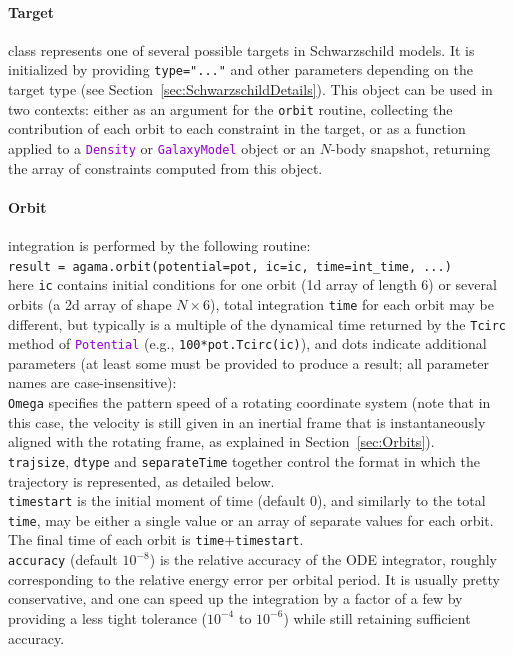 \documentclass[12pt]{article}
\newcommand{\ttt}[1]{\textcolor{darkviolet}{\texttt{#1}}}
\newcommand{\ppp}[1]{\textcolor{darkolive} {\texttt{#1}}}
\let\oldparagraph\paragraph
\renewcommand{\paragraph}[1]{\vspace{-2mm}\oldparagraph{#1}}
\begin{document}
\paragraph{Target} class represents one of several possible targets in Schwarzschild models. It is initialized by providing \ppp{type="..."} and other parameters depending on the target type (see Section~\ref{sec:SchwarzschildDetails}). This object can be used in two contexts: either as an argument for the \texttt{orbit} routine, collecting the contribution of each orbit to each constraint in the target, or as a function applied to a \ttt{Density} or \ttt{GalaxyModel} object or an $N$-body snapshot, returning the array of constraints computed from this object.

\paragraph{Orbit} integration is performed by the following routine:\\
\texttt{result = agama.orbit(potential=pot, ic=ic, time=int_time, ...)}\\
here \ppp{ic} contains initial conditions for one orbit (1d array of length 6) or several orbits (a 2d array of shape $N\times6$), total integration \ppp{time} for each orbit may be different, but typically is a multiple of the dynamical time returned by the \texttt{Tcirc} method of \ttt{Potential} (e.g., \texttt{100*pot.Tcirc(ic)}), and dots indicate additional parameters (at least some must be provided to produce a result; all parameter names are case-insensitive):\\
\ppp{Omega} specifies the pattern speed of a rotating coordinate system (note that in this case, the velocity is still given in an inertial frame that is instantaneously aligned with the rotating frame, as explained in Section~\ref{sec:Orbits}).\\
\ppp{trajsize}, \ppp{dtype} and \ppp{separateTime} together control the format in which the trajectory is represented, as detailed below.\\
\ppp{timestart} is the initial moment of time (default 0), and similarly to the total \texttt{time}, may be either a single value or an array of separate values for each orbit. The final time of each orbit is \texttt{time}+\texttt{timestart}.\\
\ppp{accuracy} (default $10^{-8}$) is the relative accuracy of the ODE integrator, roughly corresponding to the relative energy error per orbital period. It is usually pretty conservative, and one can speed up the integration by a factor of a few by providing a less tight tolerance ($10^{-4}$ to $10^{-6}$) while still retaining sufficient accuracy.\\
\end{document}
